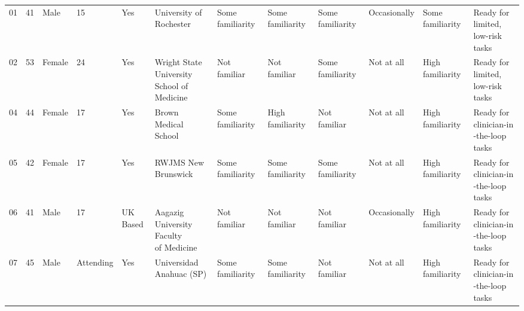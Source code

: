 \documentclass[11pt]{article}
\begin{document}
\begin{landscape}
\begin{longtable}{rlllllllllll}
01 & 41 & Male & 15 & Yes & University of Rochester & Some familiarity & Some familiarity & Some familiarity & Occasionally & Some familiarity & \makecell[l]{Ready for limited, \\low-risk tasks} \\
02 & 53 & Female & 24 & Yes & \makecell[l]{Wright State University \\School of Medicine} & Not familiar & Not familiar & Some familiarity & Not at all & High familiarity & \makecell[l]{Ready for limited, \\low-risk tasks} \\
04 & 44 & Female & 17 & Yes & Brown Medical School & Some familiarity & High familiarity & Not familiar & Not at all & High familiarity & \makecell[l]{Ready for clinician-in\\-the-loop tasks} \\
05 & 42 & Female & 17 & Yes & RWJMS New Brunswick & Some familiarity & Some familiarity & Some familiarity & Not at all & High familiarity & \makecell[l]{Ready for clinician-in\\-the-loop tasks} \\
06 & 41 & Male & 17 & UK Based & \makecell[l]{Aagazig University Faculty\\ of Medicine} & Not familiar & Not familiar & Not familiar & Occasionally & High familiarity & \makecell[l]{Ready for clinician-in\\-the-loop tasks} \\
07 & 45 & Male & Attending & Yes & Universidad Anahuac (SP) & Some familiarity & Some familiarity & Not familiar & Not at all & High familiarity & \makecell[l]{Ready for clinician-in\\-the-loop tasks} \\
\end{longtable}



\end{landscape}
\end{document}
